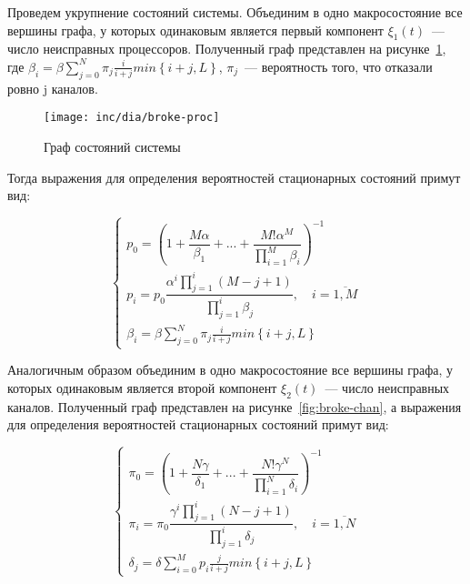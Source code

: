 Проведем укрупнение состояний системы. Объединим в одно макросостояние все вершины графа, у которых одинаковым является первый компонент $\xi_{1}(t)$~--- число неисправных процессоров. Полученный граф представлен на рисунке~\ref{fig:broke-proc}, где $\beta_i=\beta\sum\limits_{j=0}^N\pi_j\frac{i}{i+j}min\left\lbrace i+j,L\right\rbrace$, $\pi_j$~--- вероятность того, что отказали ровно j каналов.

\begin{figure}[ht]
\centering
\texttt{[image: inc/dia/broke-proc]}
\caption{Граф состояний системы}
\label{fig:broke-proc}
\end{figure}

Тогда выражения для определения вероятностей стационарных состояний примут вид:

\begin{equation}
\label{eq:broke-proc}
\left\{
   \begin{array}{lcl}
	p_{0} = \left( 1 + \dfrac{M \alpha}{\beta_1} +  ... + \dfrac{M! \alpha^{M}}{\prod \limits_{i=1}^M \beta_i} \right) ^{-1} \\
	p_{i} = p_{0} \dfrac{\alpha^{i}\prod \limits_{j=1}^{i} (M-j+1)}{\prod \limits_{j=1}^i \beta_{j}}, \quad i = \overline{1,M}  \\ 
	\beta_i=\beta\sum\limits_{j=0}^N\pi_j\frac{i}{i+j}min\left\lbrace i+j,L\right\rbrace
   \end{array}
\right.
\end{equation}
 
Аналогичным образом объединим в одно макросостояние все вершины графа, у которых одинаковым является второй компонент $\xi_{2}(t)$~--- число неисправных каналов. Полученный граф представлен на рисунке~\ref{fig:broke-chan}, а выражения для определения вероятностей стационарных состояний примут вид:

\begin{equation}
\label{eq:broke-chan}
\left\{
   \begin{array}{lcl}
	\pi_{0} = \left( 1 + \dfrac{N \gamma}{\delta_1} +  ... + \dfrac{N! \gamma^{N}}{\prod \limits_{i=1}^N \delta_i} \right) ^{-1} \\
	\pi_{i} = \pi_{0} \dfrac{\gamma^{i}\prod \limits_{j=1}^{i} (N-j+1)}{\prod \limits_{j=1}^i \delta_{j}}, \quad i = \overline{1,N}  \\ 
	\delta_j=\delta\sum\limits_{i=0}^M p_i\frac{j}{i+j}min\left\lbrace i+j,L\right\rbrace
   \end{array}
\right.
\end{equation}

